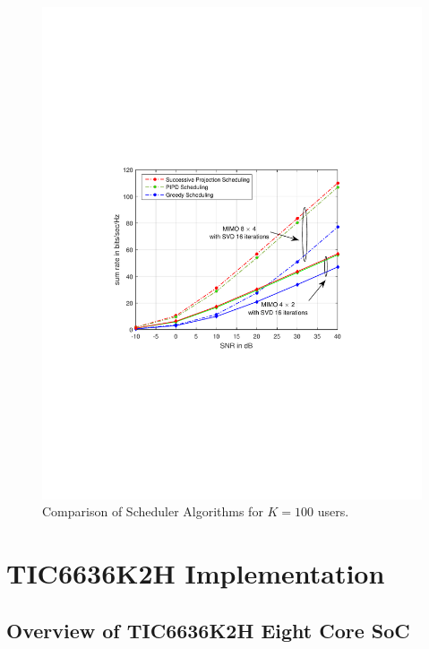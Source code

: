 \documentclass[11pt]{beamer}
\begin{document}
\begin{frame}
\begin{figure}
	\centering
	\caption{Comparison of Scheduler Algorithms for $K = 100$ users.}
	\includegraphics[trim=1.5in 3.5in 1.5in 3.5in,width=0.8\columnwidth]{sra_100}
\end{figure}
\end{frame}

\section{TIC6636K2H Implementation}

\subsection{Overview of TIC6636K2H Eight Core SoC}
\end{document}
